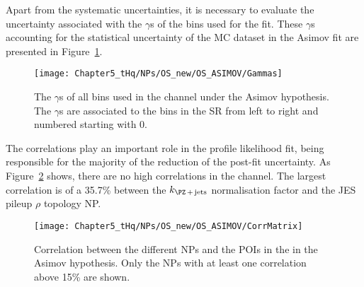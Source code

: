 Apart from the systematic uncertainties, it is necessary to evaluate the uncertainty associated with the
$\gamma$s of the bins used for the fit. These $\gamma$s accounting for the statistical uncertainty of the MC dataset in the \dilepOStau Asimov fit are presented in Figure~\ref{fig:ChaptH:Asimov:OS:Gammas}.


\begin{figure}[h]
\centering
 \texttt{[image: Chapter5\_tHq/NPs/OS\_new/OS\_ASIMOV/Gammas]}
\caption{The $\gamma$s of all bins used in the \dilepOStau channel under the Asimov hypothesis.
The $\gamma$s are associated to the bins in the SR from left to right
and numbered starting with 0.} 
\label{fig:ChaptH:Asimov:OS:Gammas}
\end{figure}

The correlations play an important role in the profile likelihood fit, being
responsible for the majority of the reduction of the post-fit uncertainty. 
As Figure~\ref{fig:ChaptH:Asimov:OS:Correlation} shows, there are 
no high correlations in the \dilepOStau channel. The largest correlation
is of a 35.7\% between the $k_{\Zjets}$ normalisation factor and the 
JES pileup $\rho$ topology NP. 



\begin{figure}[h]
\centering
 \texttt{[image: Chapter5\_tHq/NPs/OS\_new/OS\_ASIMOV/CorrMatrix]}
\caption{Correlation between the different NPs and the POIs in the \dilepOStau in the Asimov hypothesis. 
Only the NPs with at least one correlation above 15\% are shown.} 
\label{fig:ChaptH:Asimov:OS:Correlation}
\end{figure}

